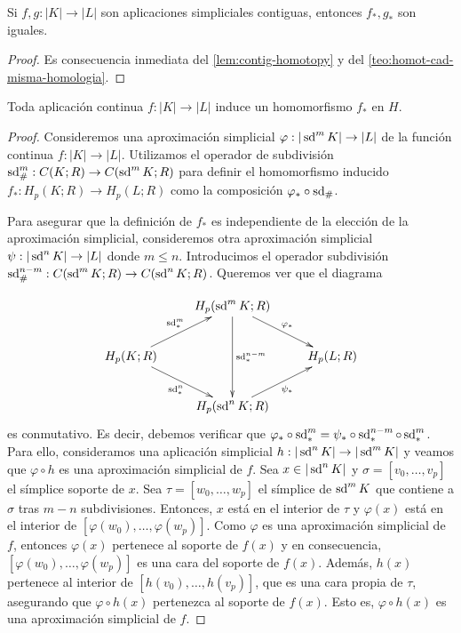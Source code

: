 \begin{corolario}
	\label{cor:contig-homotopy}
	Si $f,g : |K| \to |L|$ son aplicaciones simpliciales contiguas, entonces $f_*,g_*$ son iguales.
\end{corolario}
\begin{proof}
	Es consecuencia inmediata del \autoref{lem:contig-homotopy} y del \autoref{teo:homot-cad-misma-homologia}.
\end{proof}

\begin{teorema}
	Toda aplicación continua $f: |K| \to |L|$ induce un homomorfismo $f_*$ en $H$.
\end{teorema}
\begin{proof}
	Consideremos una aproximación simplicial \( \varphi : |\operatorname{sd}^m K| \to |L| \) de la función continua \( f: |K| \to |L| \). Utilizamos el operador de subdivisión \( \operatorname{sd}_\#^m : C(K; R) \to C(\operatorname{sd}^m K; R) \) para definir el homomorfismo inducido \( f_* : H_p(K; R) \to H_p(L; R) \) como la composición \( \varphi_* \circ \operatorname{sd}_\# \).

	Para asegurar que la definición de \( f_* \) es independiente de la elección de la aproximación simplicial, consideremos otra aproximación simplicial \( \psi : |\operatorname{sd}^n K| \to |L| \) donde \( m \leq n \). Introducimos el operador subdivisión \( \operatorname{sd}_\#^{n-m} : C(\operatorname{sd}^m K; R) \to C(\operatorname{sd}^n K; R) \). Queremos ver que el diagrama

	\[
		\xymatrix{
		& H_p(\sd^m K;R) \ar@{->}[rd]^{\varphi_*} \ar@{->}[dd]^{\sd^{n-m}_*} &  \\
		H_p(K;R) \ar@{->}[ru]^{\sd^m_*} \ar@{->}[rd]_{\sd^n_*} &  & H_p(L;R) \\
		& H_p(\sd^n K;R) \ar@{->}[ru]_{\psi_*} &
		}
	\]
	es conmutativo. Es decir, debemos verificar que \( \varphi_* \circ \operatorname{sd}^m_* = \psi_* \circ \operatorname{sd}_*^{n-m} \circ \operatorname{sd}_*^m \). Para ello, consideramos una aplicación simplicial \( h : |\operatorname{sd}^n K| \to |\operatorname{sd}^m K| \) y veamos que \( \varphi \circ h \) es una aproximación simplicial de \( f \). Sea \( x \in |\operatorname{sd}^n K| \) y \( \sigma = [v_0, \dots, v_p] \) el símplice soporte de \( x \). Sea \( \tau = [w_0, \dots, w_p] \) el símplice de \( \operatorname{sd}^m K \) que contiene a \( \sigma \) tras \( m-n \) subdivisiones. Entonces, \( x \) está en el interior de \( \tau \) y \( \varphi(x) \) está en el interior de \( [\varphi(w_0), \dots, \varphi(w_p)] \). Como $\varphi$ es una aproximación simplicial de $f$, entonces $\varphi(x)$ pertenece al soporte de $f(x)$ y en consecuencia, \( [\varphi(w_0), \dots, \varphi(w_p)] \) es una cara del soporte de \( f(x) \). Además, \( h(x) \) pertenece al interior de \( [h(v_0), \dots, h(v_p)] \), que es una cara propia de \( \tau \), asegurando que \( \varphi \circ h(x) \) pertenezca al soporte de \( f(x) \). Esto es, \( \varphi \circ h(x) \) es una aproximación simplicial de $f$.


\end{proof}
